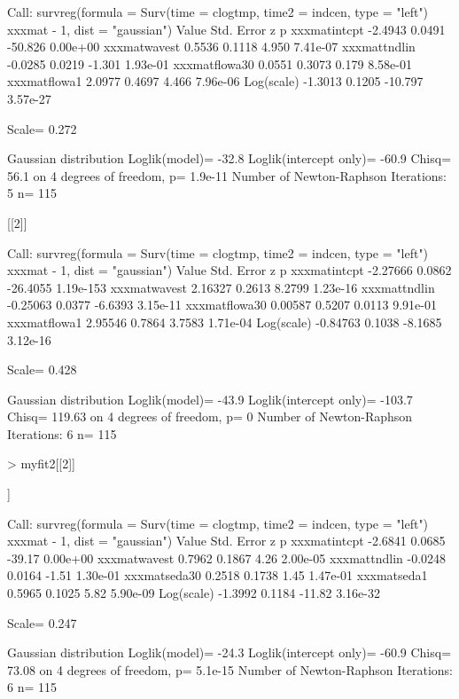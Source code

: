 \documentclass[11pt]{article}
\begin{document}
\begin{Schunk}
\begin{Soutput}
Call:
survreg(formula = Surv(time = clogtmp, time2 = indcen, type = "left") ~ 
    xxxmat - 1, dist = "gaussian")
                Value Std. Error       z        p
xxxmatintcpt  -2.4943     0.0491 -50.826 0.00e+00
xxxmatwavest   0.5536     0.1118   4.950 7.41e-07
xxxmattndlin  -0.0285     0.0219  -1.301 1.93e-01
xxxmatflowa30  0.0551     0.3073   0.179 8.58e-01
xxxmatflowa1   2.0977     0.4697   4.466 7.96e-06
Log(scale)    -1.3013     0.1205 -10.797 3.57e-27

Scale= 0.272 

Gaussian distribution
Loglik(model)= -32.8   Loglik(intercept only)= -60.9
	Chisq= 56.1 on 4 degrees of freedom, p= 1.9e-11 
Number of Newton-Raphson Iterations: 5 
n= 115 


[[2]]

Call:
survreg(formula = Surv(time = clogtmp, time2 = indcen, type = "left") ~ 
    xxxmat - 1, dist = "gaussian")
                 Value Std. Error        z         p
xxxmatintcpt  -2.27666     0.0862 -26.4055 1.19e-153
xxxmatwavest   2.16327     0.2613   8.2799  1.23e-16
xxxmattndlin  -0.25063     0.0377  -6.6393  3.15e-11
xxxmatflowa30  0.00587     0.5207   0.0113  9.91e-01
xxxmatflowa1   2.95546     0.7864   3.7583  1.71e-04
Log(scale)    -0.84763     0.1038  -8.1685  3.12e-16

Scale= 0.428 

Gaussian distribution
Loglik(model)= -43.9   Loglik(intercept only)= -103.7
	Chisq= 119.63 on 4 degrees of freedom, p= 0 
Number of Newton-Raphson Iterations: 6 
n= 115 
\end{Soutput}
\begin{Sinput}
> myfit2[[2]]
\end{Sinput}
\begin{Soutput}
[[1]]

Call:
survreg(formula = Surv(time = clogtmp, time2 = indcen, type = "left") ~ 
    xxxmat - 1, dist = "gaussian")
               Value Std. Error      z        p
xxxmatintcpt -2.6841     0.0685 -39.17 0.00e+00
xxxmatwavest  0.7962     0.1867   4.26 2.00e-05
xxxmattndlin -0.0248     0.0164  -1.51 1.30e-01
xxxmatseda30  0.2518     0.1738   1.45 1.47e-01
xxxmatseda1   0.5965     0.1025   5.82 5.90e-09
Log(scale)   -1.3992     0.1184 -11.82 3.16e-32

Scale= 0.247 

Gaussian distribution
Loglik(model)= -24.3   Loglik(intercept only)= -60.9
	Chisq= 73.08 on 4 degrees of freedom, p= 5.1e-15 
Number of Newton-Raphson Iterations: 6 
n= 115 



\end{Soutput}
\end{Schunk}
\end{document}
